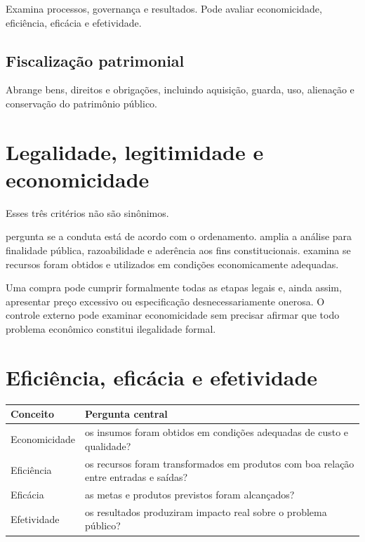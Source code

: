Examina processos, governança e resultados. Pode avaliar economicidade, eficiência, eficácia e efetividade.

\subsection{Fiscalização patrimonial}

Abrange bens, direitos e obrigações, incluindo aquisição, guarda, uso, alienação e conservação do patrimônio público.

\section{Legalidade, legitimidade e economicidade}

Esses três critérios não são sinônimos.

 pergunta se a conduta está de acordo com o ordenamento.  amplia a análise para finalidade pública, razoabilidade e aderência aos fins constitucionais.  examina se recursos foram obtidos e utilizados em condições economicamente adequadas.

\begin{exemplo}
Uma compra pode cumprir formalmente todas as etapas legais e, ainda assim, apresentar preço excessivo ou especificação desnecessariamente onerosa. O controle externo pode examinar economicidade sem precisar afirmar que todo problema econômico constitui ilegalidade formal.
\end{exemplo}

\section{Eficiência, eficácia e efetividade}

\begin{table}[ht]
\centering
\small
\begin{tabularx}{\textwidth}{l X}
\toprule
Conceito & Pergunta central \\
\midrule
Economicidade & os insumos foram obtidos em condições adequadas de custo e qualidade? \\
Eficiência & os recursos foram transformados em produtos com boa relação entre entradas e saídas? \\
Eficácia & as metas e produtos previstos foram alcançados? \\
Efetividade & os resultados produziram impacto real sobre o problema público? \\
\bottomrule
\end{tabularx}
\end{table}

